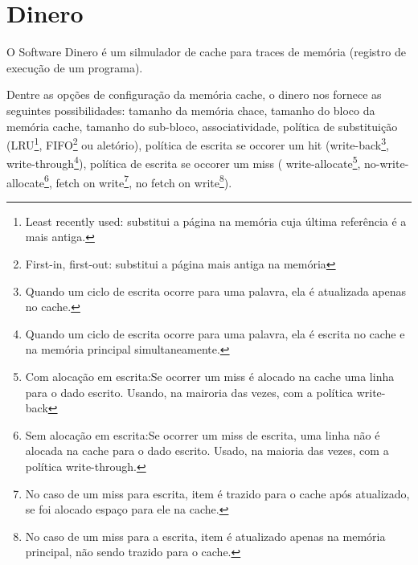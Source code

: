 \documentclass[12pt,a4paper]{article}
\begin{document}

\section{Dinero}


O Software Dinero é um silmulador de cache para traces de memória
(registro de execução de um programa).

Dentre as opções de configuração da memória cache, o dinero nos
fornece as seguintes possibilidades:
tamanho da memória chace, tamanho do bloco da memória
cache, tamanho do sub-bloco, associatividade, política de
substituição (LRU\footnote{Least recently used: substitui a página na memória cuja última referência é a mais antiga.
}, FIFO\footnote{First-in, first-out: substitui a página mais antiga na memória} ou aletório), política de escrita se occorer um hit (write-back\footnote{Quando um ciclo de escrita ocorre para uma palavra, ela é atualizada
apenas no cache.}, write-through\footnote{Quando um ciclo de escrita ocorre para uma palavra, ela é escrita
no cache e na memória principal simultaneamente.}), política de escrita se occorer um
miss ( write-allocate\footnote{Com
  alocação em escrita:Se ocorrer um miss é alocado na cache
  uma linha para o dado escrito. Usando, na mairoria das vezes, com a política write-back}, no-write-allocate\footnote{Sem
  alocação em escrita:Se ocorrer um miss de
  escrita, uma linha não é alocada na cache para o dado escrito. Usado, na maioria das vezes, com a política write-through.}, fetch on write\footnote{No caso de um miss para escrita, item é trazido
  para o cache após atualizado, se foi alocado espaço para ele na cache.}, no fetch on write\footnote{No caso de um miss para a  escrita, item é
  atualizado apenas na memória principal, não sendo trazido para o cache.}).
\end{document}

